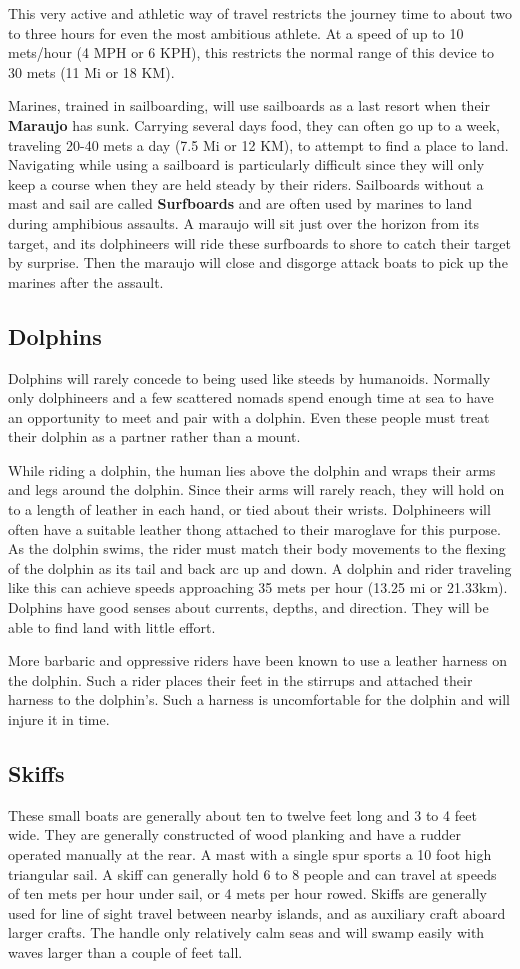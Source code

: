 \begin{multicols*}{2}
This very active and athletic way of travel restricts the journey time to about two to three hours for even the most ambitious athlete. At a speed of up to 10 mets/hour (4 MPH or 6 KPH), this restricts the normal range of this device to 30 mets (11 Mi or 18 KM).

Marines, trained in sailboarding, will use sailboards
as a last resort when their \textbf{Maraujo} has sunk. Carrying several days food, they can often go up to a week, traveling 20-40 mets a day (7.5 Mi or 12 KM), to attempt to find a place to land. Navigating while using a sailboard is particularly difficult
since they will only keep a course when they are held steady by their riders.
Sailboards without a mast and sail are called \textbf{Surfboards} and are often used by marines to land during amphibious assaults. A maraujo will sit just over the horizon from its target, and its dolphineers will ride these surfboards to shore to catch their target by surprise. Then the maraujo will close and disgorge attack boats to pick up the marines after the assault.
\subsection{Dolphins}
Dolphins will rarely concede to being used like steeds by humanoids. Normally only dolphineers and a few scattered nomads spend enough time at sea to have an opportunity to meet and pair with a dolphin. Even these people must treat their dolphin as a partner rather than a mount.

While riding a dolphin, the human lies above the dolphin and wraps their arms and legs around the dolphin. Since their arms will rarely reach, they will hold on to a length of leather in each hand, or tied about their wrists. Dolphineers will often have a suitable leather thong attached to their maroglave for this purpose. As the dolphin swims, the rider must match their body movements to the flexing of the dolphin as its tail and back arc up and down. A dolphin and rider traveling like
this can achieve speeds approaching 35 mets per hour (13.25 mi or 21.33km). Dolphins have good senses about currents, depths, and direction. They will be able to find land with little effort.

More barbaric and oppressive riders have been known to use a leather harness on the dolphin. Such a rider places their feet in the stirrups and attached their harness to the dolphin's. Such a harness is uncomfortable for the dolphin and will injure it in time.
\subsection{Skiffs}
These small boats are generally about ten to twelve feet long and 3 to 4 feet wide. They are generally constructed of wood planking and have a rudder operated manually at the rear. A mast with a single spur sports a 10 foot high triangular sail. A skiff can generally hold 6 to 8 people and can travel at speeds of ten mets per hour under sail, or 4 mets per hour rowed.
Skiffs are generally used for line of sight travel
between nearby islands, and as auxiliary craft aboard larger
crafts. The handle only relatively calm seas and will swamp
easily with waves larger than a couple of feet tall.

\end{multicols*}
